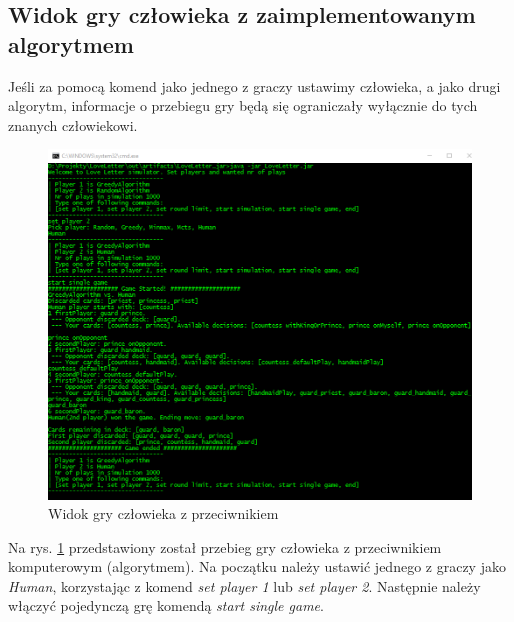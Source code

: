 \subsection*{Widok gry człowieka z zaimplementowanym algorytmem}
Jeśli za pomocą komend jako jednego z graczy ustawimy człowieka, a jako drugi algorytm, informacje o przebiegu gry będą się ograniczały wyłącznie do tych znanych człowiekowi.
\begin{figure}[H]
	\centering
	\includegraphics[width=\textwidth]{Resources/cli3.png}
	\caption{Widok gry człowieka z przeciwnikiem} 
	\label{fig:cli3}
\end{figure}

Na rys. \ref{fig:cli3} przedstawiony został przebieg gry człowieka z przeciwnikiem komputerowym (algorytmem). Na początku należy ustawić jednego z graczy jako \textit{Human}, korzystając z komend \textit{set player 1} lub \textit{set player 2}. Następnie należy włączyć pojedynczą grę komendą \textit{start single game}.


